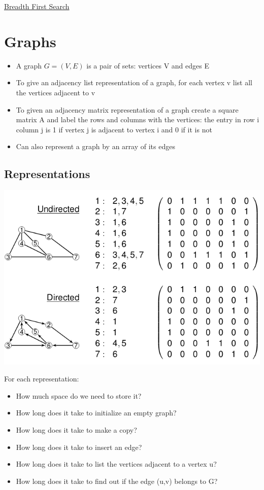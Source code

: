 \documentclass{article}[18pt]
\begin{document}
\begin{center}
\underline{\huge Breadth First Search}
\end{center}
\section{Graphs}
\begin{itemize}
	\item A graph $G=(V,E)$ is a pair of sets: vertices V and edges E
	\item To give an adjacency list representation of a graph, for each vertex v list all the vertices adjacent to v
	\item To given an adjacency matrix representation of a graph create a square matrix A and label the rows and columns with the vertices: the entry in row i column j is 1 if vertex j is adjacent to vertex i and 0 if it is not
	\item Can also represent a graph by an array of its edges
\end{itemize}
\subsection{Representations}
\begin{center}
	\includegraphics[scale=0.7]{representation}
\end{center}
For each representation:
\begin{itemize}
	\item How much space do we need to store it?
	\item How long does it take to initialize an empty graph?
	\item How long does it take to make a copy?
	\item How long does it take to insert an edge?
	\item How long does it take to list the vertices adjacent to a vertex u?
	\item How long does it take to find out if the edge (u,v) belongs to G?
\end{itemize}
\end{document}
